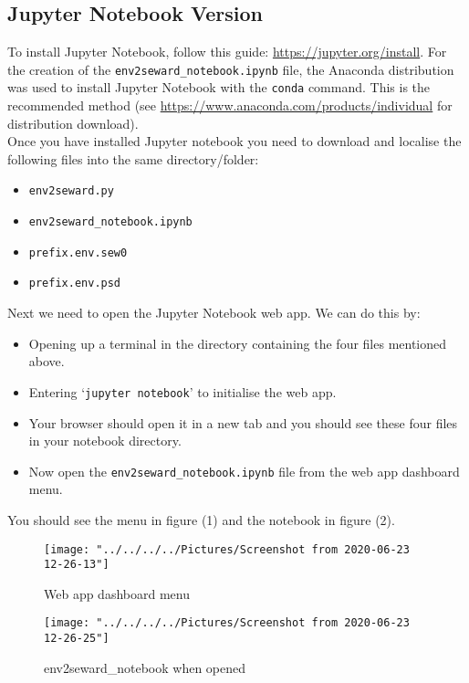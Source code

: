 \documentclass[10pt]{article}
\begin{document}
\subsection{Jupyter Notebook Version}
To install Jupyter Notebook, follow this guide: \url{https://jupyter.org/install}. For the creation of the \texttt{env2seward\_notebook.ipynb} file, the Anaconda distribution was used to install Jupyter Notebook with the \texttt{conda} command. This is the recommended method (see \url{https://www.anaconda.com/products/individual} for distribution download). 
\\
Once you have installed Jupyter notebook you need to download and localise the following files into the same directory/folder:

\begin{itemize}
	\item \texttt{env2seward.py}
	\item \texttt{env2seward\_notebook.ipynb}
	\item \texttt{prefix.env.sew0}
	\item \texttt{prefix.env.psd}
\end{itemize}
Next we need to open the Jupyter Notebook web app. We can do this by:

\begin{itemize}
	\item Opening up a terminal in the directory containing the four files mentioned above.
	\item Entering `\texttt{jupyter notebook}' to initialise the web app.
	\item Your browser should open it in a new tab and you should see these four files in your notebook directory.
	\item Now open the \texttt{env2seward\_notebook.ipynb} file from the web app dashboard menu.
\end{itemize}

You should see the menu in figure (1) and the notebook in figure (2).

\begin{figure}
	\centering
	\texttt{[image: "../../../../Pictures/Screenshot from 2020-06-23 12-26-13"]}
	\caption{Web app dashboard menu}
	\label{fig:screenshot-from-2020-06-23-12-26-13}
\end{figure}

\begin{figure}
	\centering
	\texttt{[image: "../../../../Pictures/Screenshot from 2020-06-23 12-26-25"]}
	\caption{env2seward\_notebook when opened}
	\label{fig:screenshot-from-2020-06-23-12-26-25}
\end{figure}
\end{document}

